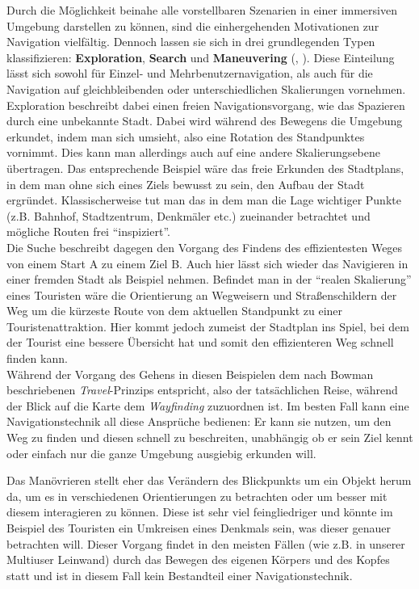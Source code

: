 Durch die Möglichkeit beinahe alle vorstellbaren Szenarien in einer immersiven Umgebung darstellen zu können, sind die einhergehenden Motivationen zur Navigation vielfältig. Dennoch lassen sie sich in drei grundlegenden Typen klassifizieren: \textbf{Exploration}, \textbf{Search} und \textbf{Maneuvering} (\cite{Bowman2001AnDesign}, \cite{KulikBuildingTechniques}). 
Diese Einteilung lässt sich sowohl für Einzel- und Mehrbenutzernavigation, als auch für die Navigation auf gleichbleibenden oder unterschiedlichen Skalierungen vornehmen.
Exploration beschreibt dabei einen freien Navigationsvorgang, wie das Spazieren durch eine unbekannte Stadt. Dabei wird während des Bewegens die Umgebung erkundet, indem man sich umsieht, also eine Rotation des Standpunktes vornimmt. 
Dies kann man allerdings auch auf eine andere Skalierungsebene übertragen. Das entsprechende Beispiel wäre das freie Erkunden des Stadtplans, in dem man ohne sich eines Ziels bewusst zu sein, den Aufbau der Stadt ergründet. Klassischerweise tut man das in dem man die Lage wichtiger Punkte (z.B. Bahnhof, Stadtzentrum, Denkmäler etc.) zueinander betrachtet und mögliche Routen frei “inspiziert”.\\
Die Suche beschreibt dagegen den Vorgang des Findens des effizientesten Weges von einem Start A zu einem Ziel B. Auch hier lässt sich wieder das Navigieren in einer fremden Stadt als Beispiel nehmen. Befindet man in der “realen Skalierung” eines Touristen wäre die Orientierung an Wegweisern und Straßenschildern der Weg um die kürzeste Route von dem aktuellen Standpunkt zu einer Touristenattraktion. Hier kommt jedoch zumeist der Stadtplan ins Spiel, bei dem der Tourist eine bessere Übersicht hat und somit den effizienteren Weg schnell finden kann.\\
Während der Vorgang des Gehens in diesen Beispielen dem nach Bowman beschriebenen \textit{Travel}-Prinzips entspricht, also der tatsächlichen Reise, während der Blick auf die Karte dem \textit{Wayfinding} zuzuordnen ist. 
Im besten Fall kann eine Navigationstechnik all diese Ansprüche bedienen: Er kann sie nutzen, um den Weg zu finden und diesen schnell zu beschreiten, unabhängig ob er sein Ziel kennt oder einfach nur die ganze Umgebung ausgiebig erkunden will.

Das Manövrieren stellt eher das Verändern des Blickpunkts um ein Objekt herum da, um es in verschiedenen Orientierungen zu betrachten oder um besser mit diesem interagieren zu können. Diese ist sehr viel feingliedriger und könnte im Beispiel des Touristen ein Umkreisen eines Denkmals sein, was dieser genauer betrachten will. Dieser Vorgang findet in den meisten Fällen (wie z.B. in unserer Multiuser Leinwand) durch das Bewegen des eigenen Körpers und des Kopfes statt und ist in diesem Fall kein Bestandteil einer Navigationstechnik.

